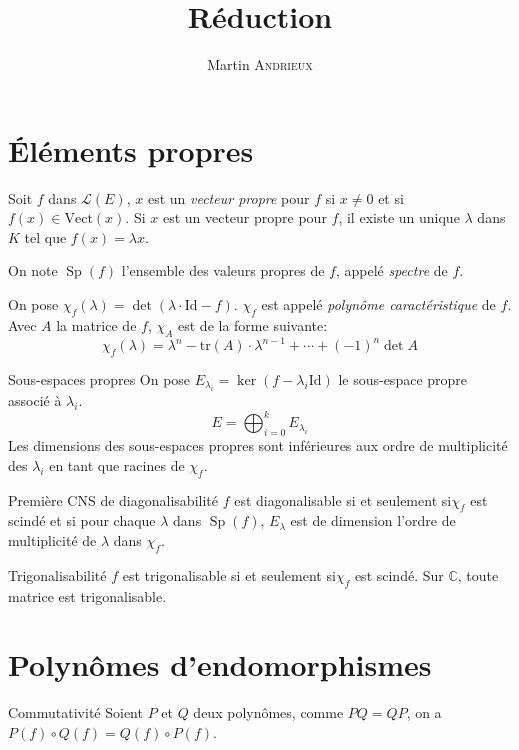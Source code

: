 \documentclass[french, a4paper, 11pt, twocolumn]{article}
\title{Réduction}
\author{Martin \textsc{Andrieux}}
\date{}
\newcommand{\ssi}{si et seulement si\xspace}		%
\DeclareMathOperator{\Sp}{Sp}
\newcommand{\C}{\mathbb{C}}   %
\newcommand{\po}{\left(}         %
\newcommand{\pf}{\right)}        %
\newcommand{\pof}[1]{\po #1 \pf} %
\begin{document}
\maketitle

\section{Éléments propres}
\begin{definition}
  Soit \(f\) dans \(\mathcal L(E)\), \(x\) est un \emph{vecteur propre} pour \(f\) si \(x\neq 0\) et si \(f(x)\in \mathrm{Vect}(x)\).
  Si \(x\) est un vecteur propre pour \(f\), il existe un unique \(\lambda\) dans \(K\) tel que \(f(x) = \lambda x\).

  On note \(\Sp(f)\) l'ensemble des valeurs propres de \(f\), appelé \emph{spectre} de \(f\).
\end{definition}

\begin{definition}
  On pose \(\chi_{f}(\lambda) = \det\pof{\lambda\cdot\mathrm{Id} - f}\). \(\chi_{f}\) est appelé \emph{polynôme caractéristique} de \(f\). Avec \(A\) la matrice de \(f\), \(\chi_{A}\) est de la forme suivante:
  \[\chi_{f}(\lambda) = \lambda^{n}-\mathrm{tr}(A)\cdot\lambda^{n-1}+\cdots+\pof{-1}^{n}\det A\]
\end{definition}

\begin{theoreme}{Sous-espaces propres}
  On pose \(E_{\lambda_{i}} = \ker(f-\lambda_{i}\mathrm{Id})\) le sous-espace propre associé à \(\lambda_{i}\).
  \[E = \bigoplus_{i=0}^{k}E_{\lambda_{i}}\]
  Les dimensions des sous-espaces propres sont inférieures aux ordre de multiplicité des \(\lambda_{i}\) en tant que racines de \(\chi_{f}\).
\end{theoreme}

\begin{theoreme}{Première CNS de diagonalisabilité}
  \(f\) est diagonalisable \ssi \(\chi_{f}\) est scindé et si pour chaque \(\lambda\) dans \(\Sp(f)\), \(E_{\lambda}\) est de dimension l'ordre de multiplicité de \(\lambda\) dans \(\chi_{f}\).
\end{theoreme}

\begin{theoreme}{Trigonalisabilité}
  \(f\) est trigonalisable \ssi \(\chi_{f}\) est scindé.
  \tcblower
  Sur \(\C\), toute matrice est trigonalisable.
\end{theoreme}

\section{Polynômes d'endomorphismes}
\begin{theoreme}{Commutativité}
  Soient \(P\) et \(Q\) deux polynômes, comme \(PQ=QP\), on a \(P(f)\circ Q(f)=Q(f)\circ P(f)\).
\end{theoreme}
\end{document}
